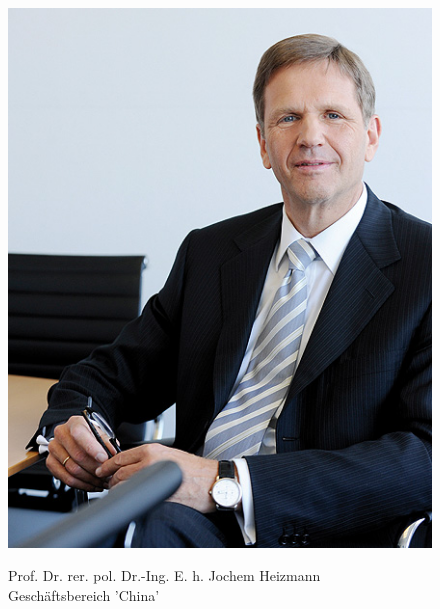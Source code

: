 \documentclass[12pt]{article}
\begin{document}
\begin{figure}[here!]
	\centering
	\begin{minipage}[h]{0.20\textwidth}
		\centering
		\includegraphics[width=1.0\textwidth]{images/JochemHeizmann.jpg}
		\label{fig:vorstandvw2}
	\end{minipage}
	\begin{minipage}[h]{0.10\textwidth}
		\hspace{1cm} 
	\end{minipage}
	\begin{minipage}[h]{0.65\textwidth}
		Prof. Dr. rer. pol. Dr.-Ing. E. h. Jochem Heizmann\\
		Geschäftsbereich 'China'
	\end{minipage}
\end{figure}
\end{document}
